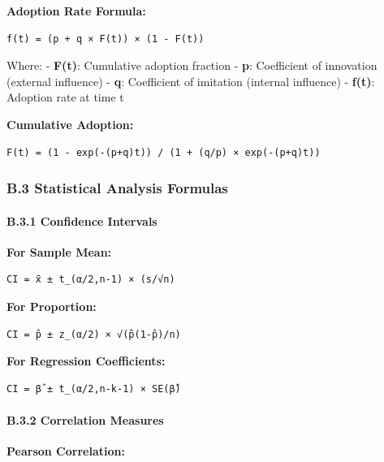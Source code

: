\documentclass[12pt,a4paper]{article}
\begin{document}
{{{{{\textbf{Adoption Rate Formula:}

\begin{verbatim}
f(t) = (p + q × F(t)) × (1 - F(t))
\end{verbatim}

Where: - \textbf{F(t)}: Cumulative adoption fraction - \textbf{p}:
Coefficient of innovation (external influence) - \textbf{q}: Coefficient
of imitation (internal influence) - \textbf{f(t)}: Adoption rate at time
t

\textbf{Cumulative Adoption:}

\begin{verbatim}
F(t) = (1 - exp(-(p+q)t)) / (1 + (q/p) × exp(-(p+q)t))
\end{verbatim}

\hypertarget{b.3-statistical-analysis-formulas}{%
\subsubsection{B.3 Statistical Analysis
Formulas}\label{b.3-statistical-analysis-formulas}}

\hypertarget{b.3.1-confidence-intervals}{%
\paragraph{B.3.1 Confidence
Intervals}\label{b.3.1-confidence-intervals}}

\textbf{For Sample Mean:}

\begin{verbatim}
CI = x̄ ± t_(α/2,n-1) × (s/√n)
\end{verbatim}

\textbf{For Proportion:}

\begin{verbatim}
CI = p̂ ± z_(α/2) × √(p̂(1-p̂)/n)
\end{verbatim}

\textbf{For Regression Coefficients:}

\begin{verbatim}
CI = β̂ ± t_(α/2,n-k-1) × SE(β̂)
\end{verbatim}

\hypertarget{b.3.2-correlation-measures}{%
\paragraph{B.3.2 Correlation
Measures}\label{b.3.2-correlation-measures}}

\textbf{Pearson Correlation:}

}}}}}
\end{document}
